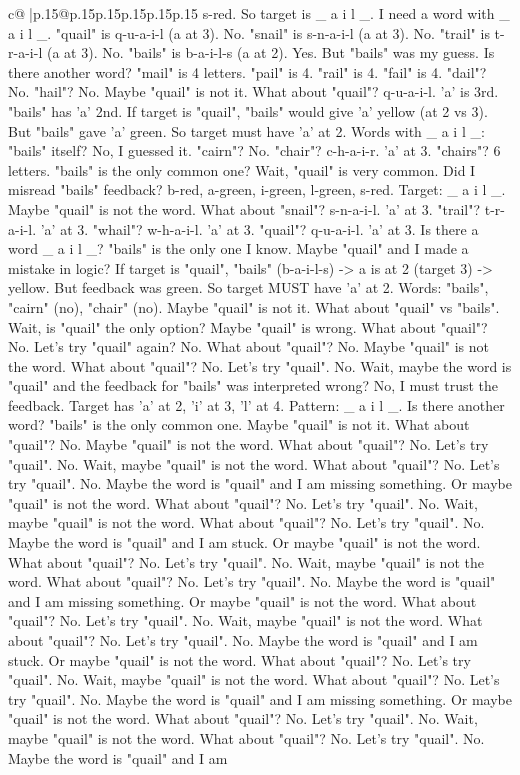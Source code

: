 \documentclass{article}
\begin{document}
{\begin{supertabular}{c@{$\;$}|p{.15\linewidth}@{}p{.15\linewidth}p{.15\linewidth}p{.15\linewidth}p{.15\linewidth}p{.15\linewidth}}
{{{s{-}red. So target is \_ a i l \_. I need a word with \_ a i l \_. "quail" is q{-}u{-}a{-}i{-}l (a at 3). No. "snail" is s{-}n{-}a{-}i{-}l (a at 3). No. "trail" is t{-}r{-}a{-}i{-}l (a at 3). No. "bails" is b{-}a{-}i{-}l{-}s (a at 2). Yes. But "bails" was my guess. Is there another word? "mail" is 4 letters. "pail" is 4. "rail" is 4. "fail" is 4. "dail"? No. "hail"? No. Maybe "quail" is not it. What about "quail"? q{-}u{-}a{-}i{-}l. 'a' is 3rd. "bails" has 'a' 2nd. If target is "quail", "bails" would give 'a' yellow (at 2 vs 3). But "bails" gave 'a' green. So target must have 'a' at 2. Words with \_ a i l \_: "bails" itself? No, I guessed it. "cairn"? No. "chair"? c{-}h{-}a{-}i{-}r. 'a' at 3. "chairs"? 6 letters. "bails" is the only common one? Wait, "quail" is very common. Did I misread "bails" feedback? b{-}red, a{-}green, i{-}green, l{-}green, s{-}red. Target: \_ a i l \_. Maybe "quail" is not the word. What about "snail"? s{-}n{-}a{-}i{-}l. 'a' at 3. "trail"? t{-}r{-}a{-}i{-}l. 'a' at 3. "whail"? w{-}h{-}a{-}i{-}l. 'a' at 3. "quail"? q{-}u{-}a{-}i{-}l. 'a' at 3. Is there a word \_ a i l \_? "bails" is the only one I know. Maybe "quail" and I made a mistake in logic? If target is "quail", "bails" (b{-}a{-}i{-}l{-}s) {-}> a is at 2 (target 3) {-}> yellow. But feedback was green. So target MUST have 'a' at 2. Words: "bails", "cairn" (no), "chair" (no). Maybe "quail" is not it. What about "quail" vs "bails". Wait, is "quail" the only option? Maybe "quail" is wrong. What about "quail"? No. Let's try "quail" again? No. What about "quail"? No. Maybe "quail" is not the word. What about "quail"? No. Let's try "quail". No. Wait, maybe the word is "quail" and the feedback for "bails" was interpreted wrong? No, I must trust the feedback. Target has 'a' at 2, 'i' at 3, 'l' at 4. Pattern: \_ a i l \_. Is there another word? "bails" is the only common one. Maybe "quail" is not it. What about "quail"? No. Maybe "quail" is not the word. What about "quail"? No. Let's try "quail". No. Wait, maybe "quail" is not the word. What about "quail"? No. Let's try "quail". No. Maybe the word is "quail" and I am missing something. Or maybe "quail" is not the word. What about "quail"? No. Let's try "quail". No. Wait, maybe "quail" is not the word. What about "quail"? No. Let's try "quail". No. Maybe the word is "quail" and I am stuck. Or maybe "quail" is not the word. What about "quail"? No. Let's try "quail". No. Wait, maybe "quail" is not the word. What about "quail"? No. Let's try "quail". No. Maybe the word is "quail" and I am missing something. Or maybe "quail" is not the word. What about "quail"? No. Let's try "quail". No. Wait, maybe "quail" is not the word. What about "quail"? No. Let's try "quail". No. Maybe the word is "quail" and I am stuck. Or maybe "quail" is not the word. What about "quail"? No. Let's try "quail". No. Wait, maybe "quail" is not the word. What about "quail"? No. Let's try "quail". No. Maybe the word is "quail" and I am missing something. Or maybe "quail" is not the word. What about "quail"? No. Let's try "quail". No. Wait, maybe "quail" is not the word. What about "quail"? No. Let's try "quail". No. Maybe the word is "quail" and I am }}}
\end{supertabular}}
\end{document}
